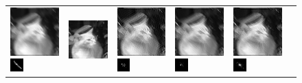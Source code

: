 \begin{figure}
\begin{tabular}{|l|l|l|l|l|l|}
\\ 
 \hline\includegraphics[width=2.5cm]{results/louxor_kernel3_blurred.png}
\includegraphics[width=0.5cm]{images/kernel3}
& \includegraphics[width=2.5cm]{results/louxor_kernel3_nonblind_deconv.png}
&\includegraphics[width=2.5cm]{results/louxor_kernel3_MAPxk_x.png}
\includegraphics[width=0.5cm]{results/louxor_kernel3_MAPxk_k.png}
&\includegraphics[width=2.5cm]{results/louxor_kernel3_MAPk_x.png}
\includegraphics[width=0.5cm]{results/louxor_kernel3_MAPk_k.png}
&\includegraphics[width=2.5cm]{results/louxor_kernel3_MAPkreg_x.png}
\includegraphics[width=0.5cm]{results/louxor_kernel3_MAPkreg_k.png}
\\ 

\end{tabular}
\end{figure}
